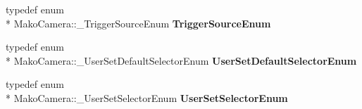 \begin{DoxyCompactItemize}
\item 
\hypertarget{classMakoCamera_a0549b40b255b8fca0ec7d6c665458c90}{typedef enum \\*
Mako\-Camera\-::\-\_\-\-Trigger\-Source\-Enum {\bfseries Trigger\-Source\-Enum}}\label{classMakoCamera_a0549b40b255b8fca0ec7d6c665458c90}

\item 
\hypertarget{classMakoCamera_ac65d5e275306fcc8540a3d0baadbadf1}{typedef enum \\*
Mako\-Camera\-::\-\_\-\-User\-Set\-Default\-Selector\-Enum {\bfseries User\-Set\-Default\-Selector\-Enum}}\label{classMakoCamera_ac65d5e275306fcc8540a3d0baadbadf1}

\item 
\hypertarget{classMakoCamera_ad90059ed50a1cd7c9d087fa0fd0d1480}{typedef enum \\*
Mako\-Camera\-::\-\_\-\-User\-Set\-Selector\-Enum {\bfseries User\-Set\-Selector\-Enum}}\label{classMakoCamera_ad90059ed50a1cd7c9d087fa0fd0d1480}

\end{DoxyCompactItemize}
